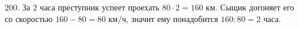 200. За 2 часа преступник успеет проехать $80\cdot2=160$ км. Сыщик догоняет его со скоростью $160-80=80$ км/ч, значит ему понадобится $160:80=2$ часа.\\
